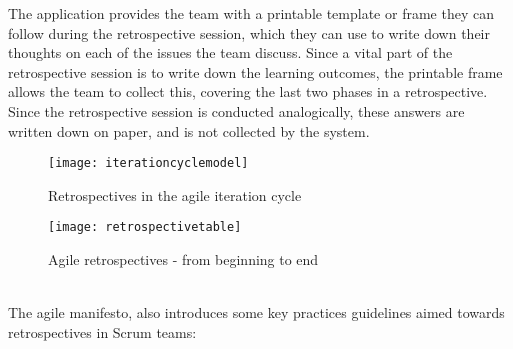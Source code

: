 The application provides the team with a printable template or frame they can follow during the retrospective session, which they can use to write down their thoughts on each of the issues the team discuss. Since a vital part of the retrospective session is to write down the learning outcomes, the printable frame allows the team to collect this, covering the last two phases in a retrospective. Since the retrospective session is conducted analogically, these answers are written down on paper, and is not collected by the system. 
\begin{figure}[!htpb]
\centering
	\texttt{[image: iterationcyclemodel]}
\caption{Retrospectives in the agile iteration cycle \citep{Derby2006}}
\label{fig:itcyclemodel}
\end{figure}
\begin{figure}[!htpb]
\centering
	\texttt{[image: retrospectivetable]}
\caption{Agile retrospectives - from beginning to end \citep{Derby2006}}
\label{fig:retrospectivetable}
\end{figure}
\\
The agile manifesto, also introduces some key practices guidelines aimed towards retrospectives in Scrum teams\citep{agilemanifesto}:
